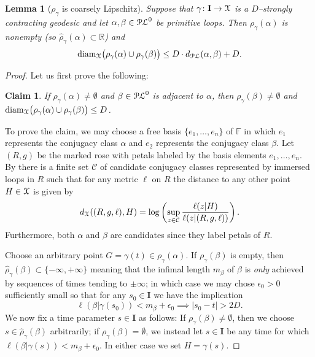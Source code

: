 \documentclass[letterpaper,fleqn]{article}
\theoremstyle{plain}
\newtheorem{lemma}[theorem]{Lemma}
\newtheorem*{claim}{Claim}
\theoremstyle{definition}
\newcommand{\R}{\mathbb{R}}
\DeclareMathOperator{\diam}{diam}
\newcommand{\abs}[1]{\left\vert#1\right\vert}
\newcommand{\free}{\mathbb{F}} %
\newcommand{\pl}{{\EuScript{PL}}} %
\newcommand{\os}{{\EuScript X}} %
\newcommand{\len}{\ell}  %
\newcommand{\minlen}{m}  %
\newcommand{\minpts}{\rho} %
\newcommand{\mintime}{\hat{\minpts}} %
\renewcommand{\diam}{\mathrm{diam}}
\newcommand{\I}{\mathbf{I}}
\begin{document}
\begin{lemma}[$\minpts_\gamma$ is coarsely Lipschitz]
\label{lem:coarse_lip_projection}
Suppose that $\gamma\colon \I\to \os$ is a $D$--strongly contracting geodesic and let $\alpha,\beta\in\pl^0$ be primitive loops. Then $\minpts_\gamma(\alpha)$ is nonempty (so $\mintime_\gamma(\alpha)\subset\R$) and 
\[\displaystyle \diam_\os\big(\minpts_\gamma(\alpha)\cup \minpts_\gamma(\beta)\big) \le D \cdot d_\pl(\alpha,\beta) + D.\]
\end{lemma}
\begin{proof}
Let us first prove the following:
\begin{claim}
If $\minpts_\gamma(\alpha)\neq\emptyset$ and $\beta\in \pl^0$ is adjacent to $\alpha$, then $\minpts_\gamma(\beta)\neq \emptyset$ and $\diam_\os\big(\minpts_\gamma(\alpha)\cup\minpts_\gamma(\beta)\big)\le D$.
\end{claim}
To prove the claim, we may choose a free basis $\{e_1,\dotsc,e_n\}$ of $\free$ in which $e_1$ represents the conjugacy class $\alpha$ and $e_2$ represents the conjugacy class $\beta$. Let $(R,g)$ be the marked rose with petals labeled by the basis elements $e_1,\dotsc, e_n$. By  there is a finite set $\mathcal{C}$ of candidate conjugacy classes represented by immersed loops in $R$ such that for any metric $\ell$ on $R$ the distance to any other point $H\in \os$ is given by
\[d_\os((R,g,\ell),H) = \log\left(\sup_{z\in \mathcal C} \frac{\ell(z \vert H)}{\ell(z \vert (R,g,\ell))}\right).\]
Furthermore, both $\alpha$ and $\beta$ are candidates since they label petals of $R$. 

Choose an arbitrary point $G = \gamma(t) \in \minpts_\gamma(\alpha)$. If $\minpts_\gamma(\beta)$ is empty, then $\mintime_\gamma(\beta) \subset \{-\infty,+\infty\}$ meaning that the infimal length $\minlen_\beta$ of $\beta$ is \emph{only} achieved by sequences of times tending to $\pm\infty$; in which case we may chose $\epsilon_0 > 0$ sufficiently small so that for any $s_0\in \I$ we have the implication
\begin{equation}\label{eqn:epsilon_0_choice}
\len(\beta\vert \gamma(s_0)) < \minlen_\beta + \epsilon_0 \implies \abs{s_0-t}> 2D.
\end{equation}
We now fix a time parameter $s\in \I$ as follows: If $\minpts_\gamma(\beta)\neq\emptyset$, then we choose $s\in \mintime_\gamma(\beta)$ arbitrarily; if $\minpts_\gamma(\beta)= \emptyset$, we instead let $s\in \I$ be any time for which $\len(\beta\vert \gamma(s))< \minlen_\beta+\epsilon_0$. In either case we set $H = \gamma(s)$.


\end{proof}
\end{document}
